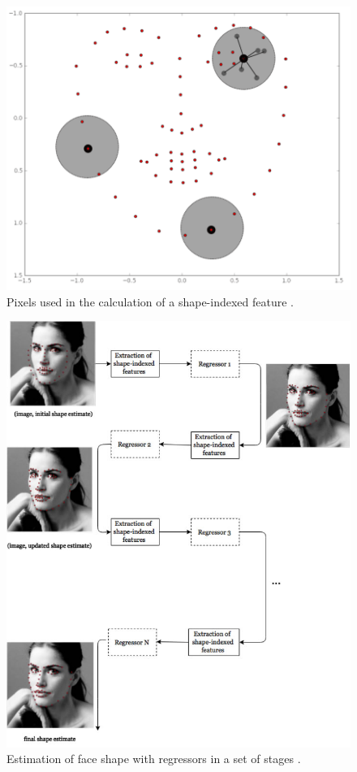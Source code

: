 \begin{figure}[ht]
    \centering
    \includegraphics[width=0.7\linewidth]{figures/shape-indexed.png}
    \caption{Pixels used in the calculation of a shape-indexed feature \parencite{maris2015}.}
    \label{fig:shape-indexed}
\end{figure}

\begin{figure}[ht]
    \centering
    \includegraphics[width=0.9\linewidth]{figures/cascade-explanation.jpg}
    \caption{Estimation of face shape with regressors in a set of stages \parencite{maris2015}.}
    \label{fig:regressor-steps}
\end{figure}

